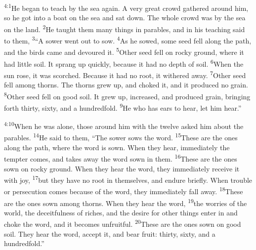 \documentclass[openany,12pt,english]{book}
\newenvironment{para}{\par\pretolerance=100\tolerance=200\setlength{\emergencystretch}{0.6em}\relax}{\par}
\begin{document}
\bigskip{}

\begin{para}
    \textsuperscript{4:1}\thinspace{}He be\-gan to teach by the sea a\-gain. A ver\-y great crowd gathered a\-round him, so he got in\-to a boat on the sea and sat down. The whole crowd was by the sea on the land.
    \textsuperscript{2}\thinspace{}He taught them man\-y things in parables, and in his teach\-ing said to them,
    \textsuperscript{3}\thinspace{}“A sower went out to sow.
    \textsuperscript{4}\thinspace{}As he sowed, some seed fell a\-long the path, and the birds came and devoured it.
    \textsuperscript{5}\thinspace{}Oth\-er seed fell on rock\-y ground, where it had lit\-tle soil. It sprang up quick\-ly, be\-cause it had no depth of soil.
    \textsuperscript{6}\thinspace{}When the sun rose, it was scorched. Be\-cause it had no root, it withered a\-way.
    \textsuperscript{7}\thinspace{}Oth\-er seed fell a\-mong thorns. The thorns grew up, and choked it, and it pro\-duced no grain.
    \textsuperscript{8}\thinspace{}Oth\-er seed fell on good soil. It grew up, in\-creased, and pro\-duced grain, bring\-ing forth thir\-ty, six\-ty, and a hun\-dred\-fold.
    \textsuperscript{9}\thinspace{}He who has ears to hear, let him hear.”
\end{para}

\begin{para}
    \textsuperscript{4:10}\thinspace{}When he was a\-lone, those a\-round him with the twelve asked him a\-bout the parables.
    \textsuperscript{14}\thinspace{}He said to them, “The sower sows the word.
    \textsuperscript{15}\thinspace{}These are the ones a\-long the path, where the word is sown. When they hear, im\-me\-di\-ate\-ly the temp\-ter co\-mes, and takes a\-way the word sown in them.
    \textsuperscript{16}\thinspace{}These are the ones sown on rock\-y ground. When they hear the word, they im\-me\-di\-ate\-ly re\-ceive it with joy,
    \textsuperscript{17}\thinspace{}but they have no root in them\-selves, and en\-dure brief\-ly. When trou\-ble or per\-se\-cu\-tion co\-mes be\-cause of the word, they im\-me\-di\-ate\-ly fall a\-way.
    \textsuperscript{18}\thinspace{}These are the ones sown a\-mong thorns. When they hear the word,
    \textsuperscript{19}\thinspace{}the worries of the world, the de\-ceit\-ful\-ness of rich\-es, and the de\-sire for oth\-er things en\-ter in and choke the word, and it becomes un\-fruit\-ful.
    \textsuperscript{20}\thinspace{}These are the ones sown on good soil. They hear the word, ac\-cept it, and bear fruit: thir\-ty, six\-ty, and a hun\-dred\-fold.”
\end{para}
\end{document}
